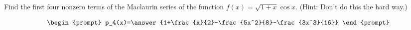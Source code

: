 \documentclass{ximera}
\author{Gregory Hartman \and Matthew Carr}
\begin{document}
\begin{exercise}






Find the first four nonzero terms of the Maclaurin series of the function $f(x)=\sqrt{1+x}\cos x$. (Hint: Don't do this the hard way.)

\[
\begin{prompt}
p_4(x)=\answer{1+\frac{x}{2}-\frac{5x^2}{8}-\frac{3x^3}{16}}
\end{prompt}
\]

\end{exercise}
\end{document}
